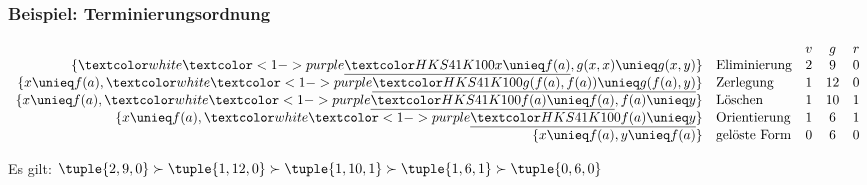 \documentclass[aspectratio=1610,onlymath]{beamer}
\begin{document}
\begin{frame}\frametitle{Beispiel: Terminierungsordnung}

\[
\begin{array}{rlccc}
&& v & g & r\\
\{\hi{1-}{x\unieq f(a)}, g(x,x)\unieq g(x,y)\} & \text{Eliminierung} & 2 & 9 & 0 \\
\{x\unieq f(a), \hi{1-}{g(f(a),f(a))\unieq g(f(a),y)}\} & \text{Zerlegung} & 1 & 12 & 0\\
\{x\unieq f(a), \hi{1-}{f(a)\unieq f(a)}, f(a)\unieq y\} & \text{Löschen} & 1 & 10 & 1\\
\{x\unieq f(a), \hi{1-}{f(a)\unieq y}\} & \text{Orientierung} & 1 & 6 & 1\\
\{x\unieq f(a), y\unieq f(a)\} & \text{gelöste Form} & 0 & 6 & 0
\end{array}
\]\bigskip

Es gilt: $\tuple{2,9,0}\succ\tuple{1,12,0}\succ\tuple{1,10,1}\succ\tuple{1,6,1}\succ\tuple{0,6,0}$

\end{frame}
\end{document}

